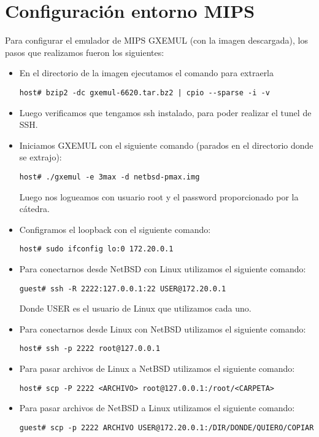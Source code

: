 \documentclass[a4paper]{article}
\begin{document}
\section{Configuración entorno MIPS}
Para configurar el emulador de MIPS GXEMUL (con la imagen descargada), los pasos que realizamos fueron los siguientes:
\begin{itemize}
	\item  En el directorio de la imagen ejecutamos el comando para extraerla
    	\begin{verbatim}
host# bzip2 -dc gxemul-6620.tar.bz2 | cpio --sparse -i -v
		\end{verbatim}
	\item Luego verificamos que tengamos ssh instalado, para poder realizar el tunel de SSH.
	\item Iniciamos GXEMUL con el siguiente comando (parados en el directorio donde se extrajo):
      	\begin{verbatim}
host# ./gxemul -e 3max -d netbsd-pmax.img
		\end{verbatim}
		Luego nos logueamos con usuario root y el password proporcionado por la cátedra.
	\item Configramos el loopback con el siguiente comando:
		\begin{verbatim}
host# sudo ifconfig lo:0 172.20.0.1
		\end{verbatim}
	\item Para conectarnos desde NetBSD con Linux utilizamos el siguiente comando:
		\begin{verbatim}
guest# ssh -R 2222:127.0.0.1:22 USER@172.20.0.1
		\end{verbatim}
		Donde USER es el usuario de Linux que utilizamos cada uno.
	\item Para conectarnos desde Linux con NetBSD utilizamos el siguiente comando:
		\begin{verbatim}
host# ssh -p 2222 root@127.0.0.1
		\end{verbatim}
	\item Para pasar archivos de Linux a NetBSD utilizamos el siguiente comando:
		\begin{verbatim}
host# scp -P 2222 <ARCHIVO> root@127.0.0.1:/root/<CARPETA>
		\end{verbatim}
	\item Para pasar archivos de NetBSD a Linux utilizamos el siguiente comando:
		\begin{verbatim}
guest# scp -p 2222 ARCHIVO USER@172.20.0.1:/DIR/DONDE/QUIERO/COPIAR
		\end{verbatim}
\end{itemize}
\end{document}
